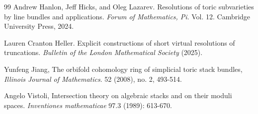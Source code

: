 \documentclass[11pt,reqno]{amsart}
\theoremstyle{definition}
\numberwithin{equation}{section}
\begin{document}
\begin{thebibliography}{99}
     Andrew Hanlon, Jeff Hicks, and Oleg Lazarev. Resolutions of toric subvarieties by line bundles and applications. \textit{Forum of Mathematics, Pi}. Vol. 12. Cambridge University Press, 2024.

     Lauren Cranton Heller. Explicit constructions of short virtual resolutions of truncations. \textit{Bulletin of the London Mathematical Society} (2025).



     Yunfeng Jiang, The orbifold cohomology ring of simplicial toric stack bundles, \textit{Illinois Journal of Mathematics}. 52 (2008), no. 2, 493-514.

     Angelo Vistoli, Intersection theory on algebraic stacks and on their moduli spaces. \textit{Inventiones mathematicae} 97.3 (1989): 613-670.

    
\end{thebibliography}
\end{document}
